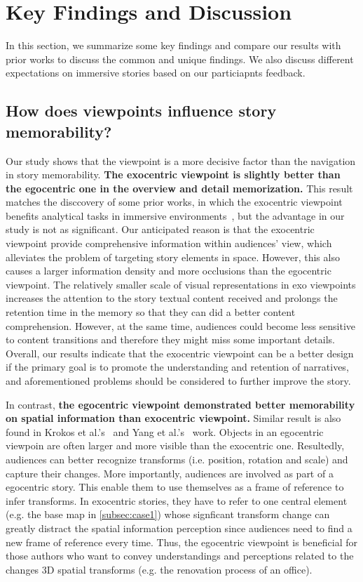 \section{Key Findings and Discussion}
In this section, we summarize some key findings and compare our results with prior works to discuss the common and unique findings. We also discuss different expectations on immersive stories based on our particiapnts feedback.

\subsection{How does viewpoints influence story memorability?}
Our study shows that the viewpoint is a more decisive factor than the navigation in story memorability. 
\textbf{The exocentric viewpoint is slightly better than the egocentric one in the overview and detail memorization.} 
This result matches the disccovery of some prior works, in which the exocentric viewpoint benefits analytical tasks in immersive environments~\cite{yang2018maps, kraus2019impact, yang2020embodied}, but the advantage in our study is not as significant.
Our anticipated reason is that the exocentric viewpoint provide comprehensive information within audiences' view, which alleviates the problem of targeting story elements in space. However, this also causes a larger information density and more occlusions than the egocentric viewpoint. The relatively smaller scale of visual representations in exo viewpoints increases the attention to the story textual content received and prolongs the retention time in the memory so that they can did a better content comprehension. However, at the same time, audiences could become less sensitive to content transitions and therefore they might miss some important details. 
Overall, our results indicate that the exocentric viewpoint can be a better design if the primary goal is to promote the understanding and retention of narratives, and aforementioned problems should be considered to further improve the story.

 
In contrast, \textbf{the egocentric viewpoint demonstrated better memorability on spatial information than exocentric viewpoint.}
Similar result is also found in Krokos et al.'s~\cite{krokos2019virtual} and Yang et al.'s~\cite{yang2020virtual} work. 
\label{subsec:dis_view}
Objects in an egocentric viewpoin are often larger and more visible than the exocentric one. Resultedly, audiences can better recognize transforms (i.e. position, rotation and scale) and capture their changes.
More importantly, audiences are involved as part of a egocentric story. This enable them to use themselves as a frame of reference to infer transforms. In exocentric stories, they have to refer to one central element (e.g. the base map in \autoref{subsec:case1}) whose signficant transform change can greatly distract the spatial information perception since audiences need to find a new frame of reference every time.
Thus, the egocentric viewpoint is beneficial for those authors who want to convey understandings and perceptions related to the changes 3D spatial transforms (e.g. the renovation process of an office).


